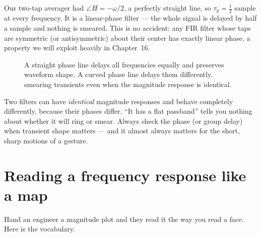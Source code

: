 Our two-tap averager had $\angle H = -\omega/2$, a perfectly straight line, so
$\tau_g = \tfrac12$ sample at every frequency. It is a linear-phase filter ---
the whole signal is delayed by half a sample and nothing is smeared. This is no
accident: any FIR filter whose taps are symmetric (or antisymmetric) about their
center has exactly linear phase, a property we will exploit heavily in
Chapter~16.

\begin{figure}[H]
\centering
{}
\caption{A straight phase line delays all frequencies equally and preserves
waveform shape. A curved phase line delays them differently, smearing transients
even when the magnitude response is identical.}
\label{ch14:fig-phase}
\end{figure}

\begin{trapbox}
Two filters can have \emph{identical} magnitude responses and behave completely
differently, because their phases differ. ``It has a flat passband'' tells you
nothing about whether it will ring or smear. Always check the phase (or group
delay) when transient shape matters --- and it almost always matters for the
short, sharp motions of a gesture.
\end{trapbox}

\section{Reading a frequency response like a map}
\label{ch14:reading}

Hand an engineer a magnitude plot and they read it the way you read a face. Here
is the vocabulary.

